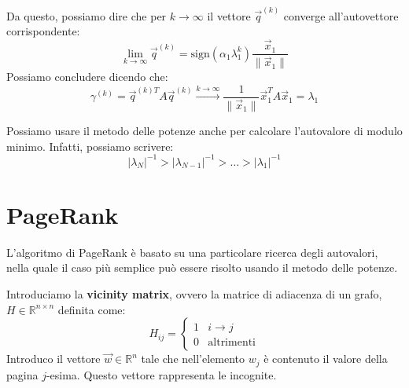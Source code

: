 Da questo, possiamo dire che per $k \to \infty$ il vettore $\vec{q}^{(k)}$ converge
all'autovettore corrispondente:
\begin{equation}
    \lim_{k \to \infty} \vec{q}^{(k)} = \text{sign}(\alpha_1\lambda_1^k) \frac{\vec{x}_1}{\|\vec{x}_1\|}
\end{equation}
Possiamo concludere dicendo che:
\begin{equation}
    \gamma^{(k)} = \vec{q}^{(k)T} A \vec{q}^{(k)} \stackrel{k \to \infty}{\to} \frac{1}{\|\vec{x}_1\|} \vec{x}_1^T A \vec{x}_1 = \lambda_1
\end{equation}
\begin{nota}
    Possiamo usare il metodo delle potenze anche per calcolare l'autovalore di modulo minimo.
    Infatti, possiamo scrivere:
    \begin{equation}
        |\lambda_N|^{-1} > |\lambda_{N - 1}|^{-1} > \ldots > |\lambda_1|^{-1}
    \end{equation}
\end{nota}
\section{PageRank}
L'algoritmo di PageRank è basato su una particolare ricerca degli autovalori,
nella quale il caso più semplice può essere risolto usando il metodo delle potenze.

Introduciamo la \textbf{vicinity matrix}, ovvero la matrice di adiacenza di
un grafo, $H \in \mathbb{R}^{n\times n}$ definita come:
\begin{equation}
    H_{ij} = \begin{cases}
        1 & i\rightarrow j    \\
        0 & \text{altrimenti}
    \end{cases}
\end{equation}
Introduco il vettore $\vec{w} \in \mathbb{R}^n$ tale che nell'elemento $w_j$ è
contenuto il valore della pagina $j$-esima. Questo vettore rappresenta le incognite.

